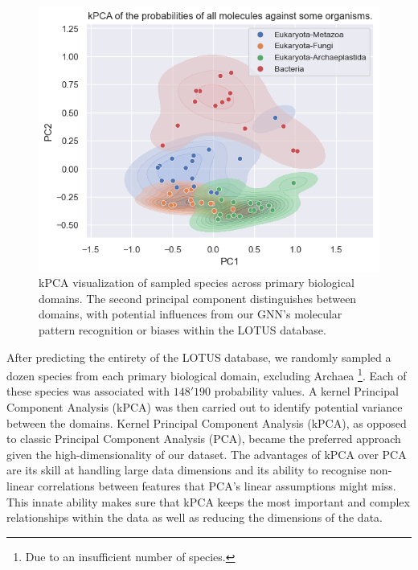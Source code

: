 \documentclass[
11pt, %
oneside, %
english, %
singlespacing, %
headsepline, %
chapterinoneline, %
]{MastersDoctoralThesis} %
\begin{document}
\begin{figure}[h]
	\centering
	\includegraphics[scale=0.7]{figure/kPCA}
	\caption{kPCA visualization of sampled species across primary biological domains. The second principal component distinguishes between domains, with potential influences from our GNN's molecular pattern recognition or biases within the LOTUS database.}
	\label{fig:kPCA}
\end{figure}

After predicting the entirety of the LOTUS database, we randomly sampled a dozen species from each primary biological domain, excluding Archaea \footnote{Due to an insufficient number of species.}. Each of these species was associated with $148'190$ probability values. A kernel Principal Component Analysis (kPCA) was then carried out to identify potential variance between the domains. Kernel Principal Component Analysis (kPCA), as opposed to classic Principal Component Analysis (PCA), became the preferred approach given the high-dimensionality of our dataset. The advantages of kPCA over PCA are its skill at handling large data dimensions and its ability to recognise non-linear correlations between features that PCA's linear assumptions might miss. This innate ability makes sure that kPCA keeps the most important and complex relationships within the data as well as reducing the dimensions of the data.
\end{document}
